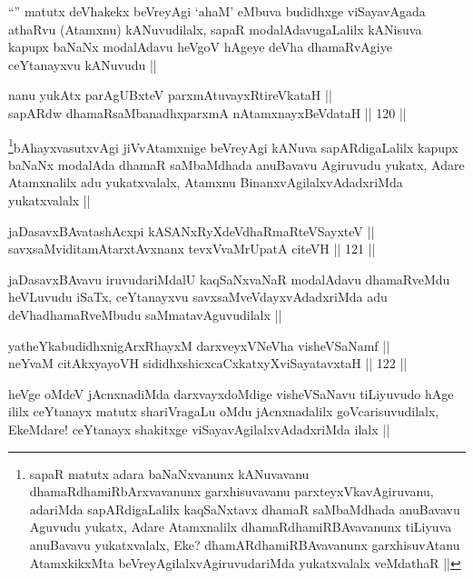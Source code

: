 \begin{artha}
``\stext'' matutx deVhakekx beVreyAgi `ahaM' eMbuva budidhxge viSayavAgada athaRvu (Atamxnu) kANuvudilalx, sapaR modalAdavugaLalilx kANisuva kapupx baNaNx modalAdavu heVgoV hAgeye deVha dhamaRvAgiye ceYtanayxvu kANuvudu ||
\end{artha}


\begin{shl}
nanu yukAtx parAgUBxteV parxmAtuvayxRtireVkataH || \\
sapARdw dhamaRsaMbanadhxparxmA nA\s \s tamxnayxBeVdataH ||  120 ||  
\end{shl}

\begin{artha}
\footnote{sapaR matutx adara baNaNxvanunx kANuvavanu dhamaRdhamiRbArxvavanunx garxhisuvavanu parxteyxVkavAgiruvanu, adariMda sapARdigaLalilx kaqSaNxtavx dhamaR saMbaMdhada anuBavavu Aguvudu yukatx, Adare Atamxnalilx dhamaRdhamiRBAvavanunx tiLiyuva anuBavavu yukatxvalalx, Eke? dhamARdhamiRBAvavanunx garxhisuvAtanu AtamxkikxMta beVreyAgilalxvAgiruvudariMda yukatxvalalx veMdathaR ||}bAhayxvasutxvAgi jiVvAtamxnige beVreyAgi kANuva sapARdigaLalilx kapupx baNaNx modalAda dhamaR saMbaMdhada anuBavavu Agiruvudu yukatx, Adare Atamxnalilx adu yukatxvalalx, Atamxnu BinanxvAgilalxvAdadxriMda yukatxvalalx ||
\end{artha}

\begin{shl}
jaDasavxBAvatashAcxpi kASANxRyXdeVdhaRmaRteVSayxteV || \\
savxsaMviditamAtarxtAvxnanx tevxVvaMrUpatA citeVH ||  121 ||  
\end{shl}

\begin{artha}
jaDasavxBAvavu iruvudariMdalU kaqSaNxvaNaR modalAdavu dhamaRveMdu heVLuvudu iSaTx, ceYtanayxvu savxsaMveVdayxvAdadxriMda adu deVhadhamaRveMbudu saMmatavAguvudilalx ||
\end{artha}

\begin{shl}
yatheYkabudidhxnigArxRhayxM darxveyxVNeVha visheVSaNamf || \\
neYvaM citAkxyayoVH sididhxshicxcaCxkatxyXviSayatavxtaH ||  122 ||  
\end{shl}

\begin{artha}
heVge oMdeV jAcnxnadiMda darxvayxdoMdige visheVSaNavu tiLiyuvudo hAge ililx ceYtanayx matutx shariVragaLu oMdu jAcnxnadalilx goVcarisuvudilalx, EkeMdare! ceYtanayx shakitxge viSayavAgilalxvAdadxriMda ilalx ||
\end{artha}

